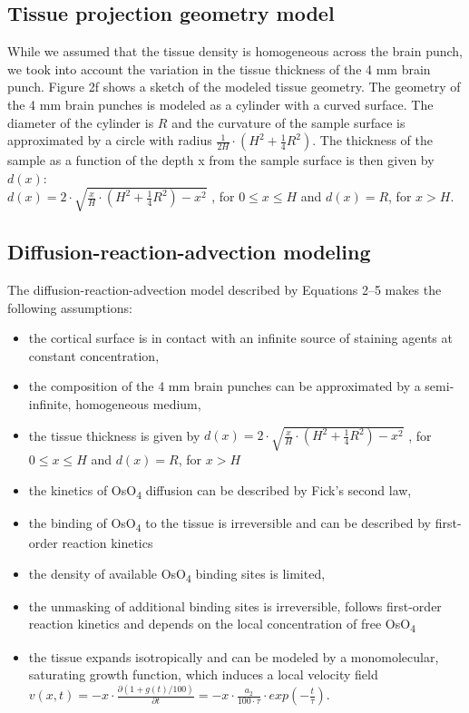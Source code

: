 \documentclass{article}
\begin{document}
\subsection*{Tissue projection geometry model}
While we assumed that the tissue density is homogeneous across the brain punch, we took into account the variation in the tissue thickness of the 4 mm brain punch. Figure 2f shows a sketch of the modeled tissue geometry. The geometry of the 4 mm brain punches is modeled as a cylinder with a curved surface. The diameter of the cylinder is $R$ and the curvature of the sample surface is approximated by a circle with radius $\frac{1}{2H}\cdot\left(H^{2}+\frac{1}{4}R^{2}\right)$. The thickness of the sample as a function of the depth x from the sample surface is then given by $d\left(x\right)$:\\
$d\left(x\right) = 2\cdot\sqrt{\frac{x}{H}\cdot\left(H^{2}+\frac{1}{4}R^{2}\right)-x^{2}}$ , for $0\leq x\leq H$ and $d\left(x\right) = R$, for $x > H$.

\subsection*{Diffusion-reaction-advection modeling}
The diffusion-reaction-advection model described by Equations 2–5 makes the following assumptions:
\begin{itemize}
\item the cortical surface is in contact with an infinite source of staining agents at constant concentration,
\item the composition of the 4 mm brain punches can be approximated by a semi-infinite, homogeneous medium,
\item the tissue thickness is given by $d\left(x\right) = 2\cdot\sqrt{\frac{x}{H}\cdot\left(H^{2}+\frac{1}{4}R^{2}\right)-x^{2}}$ , for $0\leq x\leq H$ and $d\left(x\right) = R$, for $x > H$
\item the kinetics of OsO\textsubscript{4} diffusion can be described by Fick’s second law,
\item the binding of OsO\textsubscript{4} to the tissue is irreversible and can be described by first-order reaction kinetics
\item the density of available OsO\textsubscript{4} binding sites is limited,
\item the unmasking of additional binding sites is irreversible, follows first-order reaction kinetics and depends on the local concentration of free OsO\textsubscript{4}
\item the tissue expands isotropically and can be modeled by a monomolecular, saturating growth function, which induces a local velocity field $v\left(x,t\right) = -x\cdot\frac{\partial\left(1+g\left(t\right)/100\right)}{\partial t} = -x\cdot\frac{a_{2}}{100\cdot\tau}\cdot exp\left(-\frac{t}{\tau}\right)$.
\end{itemize}
\end{document}
